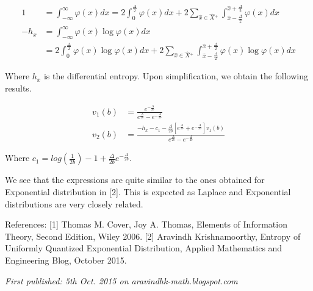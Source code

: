 \begin{align} 1 &= \int_{-\infty}^{\infty} \varphi(x) dx = 2 \int_{0}^{\frac{\Delta}{2}} \varphi(x) dx + 2 \sum_{\hat{x} \in \hat{X}{}^+} \int_{\hat{x} - \frac{\Delta}{2}}^{\hat{x} + \frac{\Delta}{2}} \varphi(x) dx \\ -h_x &= \int_{-\infty}^{\infty} \varphi(x) \log \varphi(x) dx  \nonumber\\ &= 2 \int_{0}^{\frac{\Delta}{2}} \varphi(x) \log \varphi(x) dx + 2 \sum_{\hat{x} \in \hat{X}{}^+} \int_{\hat{x} - \frac{\Delta}{2}}^{\hat{x} + \frac{\Delta}{2}} \varphi(x) \log \varphi(x) dx \end{align}

Where $h_x$ is the differential entropy. Upon simplification, we obtain the following results.

\begin{align} v_1(b) &= \frac{e^{-\frac{\Delta}{2b}}}{e^{\frac{\Delta}{2b}} - e^{-\frac{\Delta}{2b}}} \\ v_2(b) &= \frac{-h_x - c_1 - \frac{\Delta}{2b} \left[ e^{\frac{\Delta}{2b}} + e^{-\frac{\Delta}{2b}} \right] v_1(b)}{e^{\frac{\Delta}{2b}} - e^{-\frac{\Delta}{2b}}}\end{align}

Where $c_1 = log\left(\frac{1}{2b}\right) - 1 + \frac{\Delta}{2b}e^{-\frac{\Delta}{2b}}$.

We see that the expressions are quite similar to the ones obtained for Exponential distribution in [2]. This is expected as Laplace and Exponential distributions are very closely related.

References:
[1] Thomas M. Cover, Joy A. Thomas, Elements of Information Theory, Second Edition, Wiley 2006.
[2] Aravindh Krishnamoorthy, Entropy of Uniformly Quantized Exponential Distribution, Applied Mathematics and Engineering Blog, October 2015.

\emph{First published: 5th Oct. 2015 on aravindhk-math.blogspot.com}
